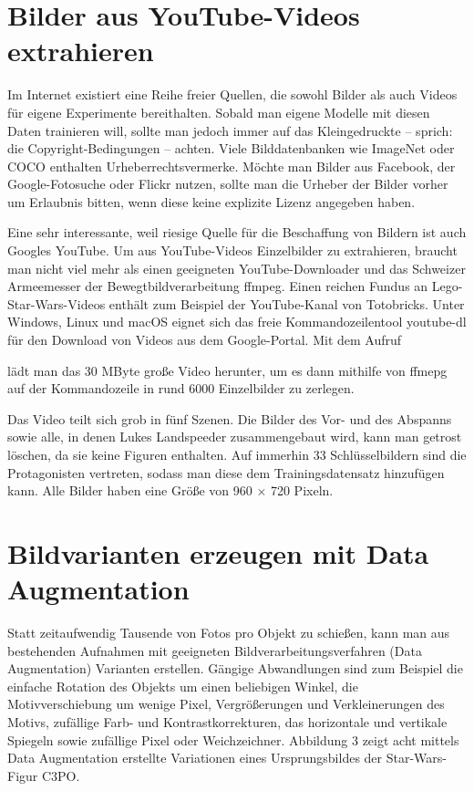 \section{Bilder aus YouTube-Videos extrahieren}

Im Internet existiert eine Reihe freier Quellen, die sowohl Bilder als auch Videos für eigene Experimente bereithalten. Sobald man eigene Modelle mit diesen Daten trainieren will, sollte man jedoch immer auf das Kleingedruckte – sprich: die Copyright-Bedingungen – achten. Viele Bilddatenbanken wie ImageNet oder COCO enthalten Urheberrechtsvermerke. Möchte man Bilder aus Facebook, der Google-­Fotosuche oder Flickr nutzen, sollte man die Urheber der Bilder vorher um Erlaubnis bitten, wenn diese keine explizite Lizenz angegeben haben. 

Eine sehr interessante, weil riesige Quelle für die Beschaffung von Bildern ist auch Googles YouTube. Um aus YouTube-Videos Einzelbilder zu extrahieren, braucht man nicht viel mehr als einen geeigneten YouTube-Downloader und das Schweizer Armeemesser der Bewegtbildverarbeitung ffmpeg. Einen reichen Fundus an Lego-Star-Wars-Videos enthält zum Beispiel der YouTube-Kanal von Totobricks. Unter Windows, Linux und macOS eignet sich das freie Kommandozeilentool youtube-dl für den Download von Videos aus dem Google-­Portal. Mit dem Aufruf 


lädt man das 30 MByte große Video herunter, um es dann mithilfe von ffmepg auf der Kommandozeile in rund 6000 Einzelbilder zu zerlegen.  


Das Video teilt sich grob in fünf Szenen. Die Bilder des Vor- und des Abspanns sowie alle, in denen Lukes Landspeeder zusammengebaut wird, kann man getrost löschen, da sie keine Figuren enthalten. Auf immerhin 33 Schlüsselbildern sind die Protagonisten vertreten, sodass man diese dem Trainingsdatensatz hinzufügen kann. Alle Bilder haben eine Größe von 960 × 720 Pixeln. 

\section{Bildvarianten erzeugen mit Data Augmentation}

Statt zeitaufwendig Tausende von Fotos pro Objekt zu schießen, kann man aus bestehenden Aufnahmen mit geeigneten Bildverarbeitungsverfahren (Data Augmentation) Varianten erstellen. Gängige Abwandlungen sind zum Beispiel die einfache Rotation des Objekts um einen beliebigen Winkel, die Motivverschiebung um wenige Pixel, Vergrößerungen und Verkleinerungen des Motivs, zufällige Farb- und Kontrastkorrekturen, das horizontale und vertikale Spiegeln sowie zufällige Pixel oder Weichzeichner. Abbildung 3 zeigt acht mittels Data Augmentation erstellte Variationen eines Ursprungsbildes der Star-Wars-Figur C3PO. 

